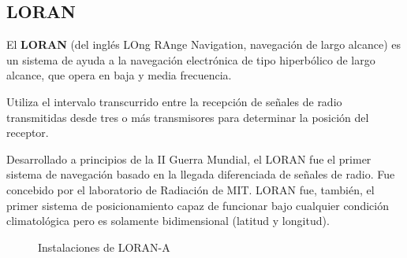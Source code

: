 \subsection{LORAN}


El \textbf{LORAN} (del ingl\'es LOng RAnge Navigation, navegaci\'on de largo alcance) es un sistema de ayuda a la navegaci\'on electr\'onica de tipo hiperb\'olico
 de largo alcance, que opera en baja y media frecuencia. 

Utiliza el intervalo transcurrido entre la recepci\'on de se\~nales de radio transmitidas desde tres o m\'as transmisores para determinar la posici\'on del receptor. 

Desarrollado a principios de la II Guerra Mundial, el LORAN fue el primer sistema de navegaci\'on basado en la llegada diferenciada de se\~nales de radio. Fue concebido por el laboratorio de Radiaci\'on de MIT. LORAN fue, tambi\'en, el primer sistema de posicionamiento capaz de funcionar bajo cualquier condici\'on climatol\'ogica pero es solamente bidimensional (latitud y longitud).

\begin{figure}[!tbh]
  \centering
  \caption{Instalaciones de LORAN-A \cite{Historia_LORAN} }
\end{figure}

